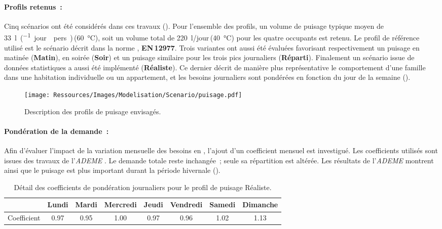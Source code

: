 \paragraph{Profils retenus~:} %
\label{par:profils_retenus}
Cinq scénarios ont été considérés dans ces travaux ().
Pour l’ensemble des profils, un volume de puisage typique moyen de
\SI{33}{\litre\per(jour\period pers)}\,(\SI{60}{\celsius}), soit un
volume total de \SI{220}{\litre/jour}\,(\SI{40}{\celsius}) pour les quatre occupants est
retenu. Le profil de référence utilisé est le scénario décrit dans la norme
\textcite{EN129771}, \textbf{EN\,12977}. Trois variantes ont aussi été évaluées favorisant
respectivement un puisage en matinée (\textbf{Matin}), en soirée (\textbf{Soir}) et un
puisage similaire pour les trois pics journaliers (\textbf{Réparti}). Finalement un scénario
issue de données statistiques \parencite{ADEME2016} a aussi été implémenté
(\textbf{Réaliste}). Ce dernier décrit de manière plus représentative le comportement
d’une famille dans une habitation individuelle ou un appartement, et les besoins
journaliers sont pondérées en fonction du jour de la semaine ().
\begin{figure}
    \centering
    \texttt{[image: Ressources/Images/Modelisation/Scenario/puisage.pdf]}
    \caption[Description des profils de puisage envisagés]
            {Description des profils de puisage envisagés.}
    \label{fig:profil_puisage}
\end{figure}

\paragraph{Pondération de la demande~:} %
\label{par:ponderation_de_la_demande}
Afin d’évaluer l’impact de la variation mensuelle des besoins en , l’ajout d’un
coefficient mensuel est investigué. Les coefficients utilisés sont issues des travaux de
l’\textit{ADEME} \parencite{ADEME2016}. Le demande totale reste inchangée~; seule sa
répartition est altérée. Les résultats de l’\textit{ADEME} montrent ainsi que le puisage est plus
important durant la période hivernale ().

\begin{table}
\centering
\caption[Détail des coefficients de pondération journaliers pour le profil de puisage Réaliste]
        {Détail des coefficients de pondération journaliers pour le profil de
         puisage Réaliste.}
\label{tab:coef_semaine}
\begin{tabular}{l*{7}{c}}
    \toprule
                & Lundi & Mardi & Mercredi & Jeudi & Vendredi & Samedi & Dimanche \\
    \midrule
    Coefficient & \num{0.97}  & \num{0.95}  & \num{1.00}     & \num{0.97}  & \num{0.96}     & \num{1.02}   & \num{1.13}     \\
    \bottomrule
\end{tabular}
\end{table}

